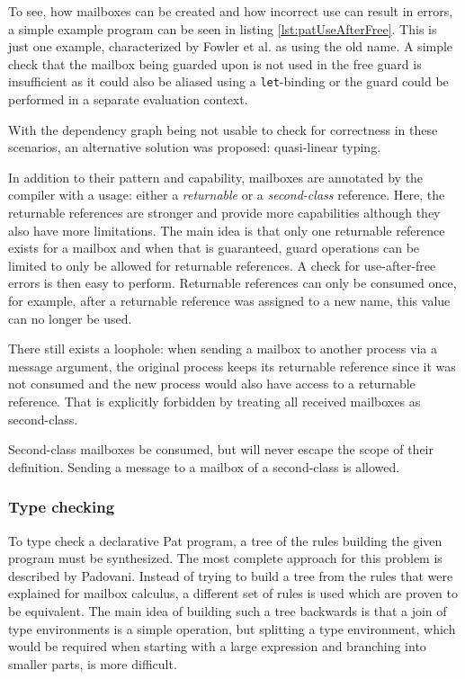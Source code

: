 To see, how mailboxes can be created and how incorrect use can result in errors, a simple example program can be seen in listing \ref{lst:patUseAfterFree}. This is just one example, characterized by Fowler et al. as using the old name. A simple check that the mailbox being guarded upon is not used in the free guard is insufficient as it could also be aliased using a \lstinline|let|-binding or the guard could be performed in a separate evaluation context.

With the dependency graph being not usable to check for correctness in these scenarios, an alternative solution was proposed: quasi-linear typing. 

In addition to their pattern and capability, mailboxes are annotated by the compiler with a usage: either a \textit{returnable} or a \textit{second-class} reference. Here, the returnable references are stronger and provide more capabilities although they also have more limitations. The main idea is that only one returnable reference exists for a mailbox and when that is guaranteed, guard operations can be limited to only be allowed for returnable references. A check for use-after-free errors is then easy to perform. Returnable references can only be consumed once, for example, after a returnable reference was assigned to a new name, this value can no longer be used.

There still exists a loophole: when sending a mailbox to another process via a message argument, the original process keeps its returnable reference since it was not consumed and the new process would also have access to a returnable reference. That is explicitly forbidden by treating all received mailboxes as second-class.

Second-class mailboxes be consumed, but will never escape the scope of their definition. Sending a message to a mailbox of a second-class is allowed.

\subsubsection{Type checking}

To type check a declarative Pat program, a tree of the rules building the given program must be synthesized. The most complete approach for this problem is described by Padovani\cite{padovaniTypeCheckingAlgorithm2018}. Instead of trying to build a tree from the rules that were explained for mailbox calculus, a different set of rules is used which are proven to be equivalent. The main idea of building such a tree backwards is that a join of type environments is a simple operation, but splitting a type environment, which would be required when starting with a large expression and branching into smaller parts, is more difficult.

